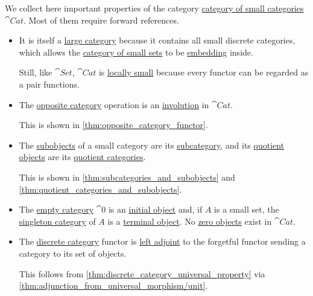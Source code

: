 \begin{remark}\label{rem:category_of_small_categories}
  We collect here important properties of the category \hyperref[def:category_of_small_categories]{category of small categories} \( \cat{Cat} \). Most of them require forward references.

  \begin{itemize}
    \item It is itself a \hyperref[def:small_category]{large category} because it contains all small discrete categories, which allows the \hyperref[def:category_of_small_sets]{category of small sets} to be \hyperref[def:functor_invertibility/injective]{embedding} inside.

    Still, like \( \cat{Set} \), \( \cat{Cat} \) is \hyperref[def:small_category]{locally small} because every functor can be regarded as a pair functions.

    \item The \hyperref[def:opposite_category]{opposite category} operation is an \hyperref[def:categorical_involution]{involution} in \( \cat{Cat} \).

    This is shown in \cref{thm:opposite_category_functor}.

    \item The \hyperref[def:categorical_subobject]{subobjects} of a small category are its \hyperref[def:subcategory]{subcategory}, and its \hyperref[def:categorical_quotient_object]{quotient objects} are its \hyperref[def:quotient_category]{quotient categories}.

    This is shown in \cref{thm:subcategories_and_subobjects} and \cref{thm:quotient_categories_and_subobjects}.

    \item The \hyperref[def:empty_category]{empty category} \( \cat{0} \) is an \hyperref[def:universal_objects/initial]{initial object} and, if \( A \) is a small set, the \hyperref[def:singleton_category]{singleton category} of \( A \) is a \hyperref[def:universal_objects/terminal]{terminal object}. No \hyperref[def:universal_objects/zero]{zero objects} exist in \( \cat{Cat} \).

    \item The \hyperref[def:discrete_category]{discrete category} functor is \hyperref[def:adjoint_functor]{left adjoint} to the forgetful functor sending a category to its set of objects.

    This follows from \cref{thm:discrete_category_universal_property} via \cref{thm:adjunction_from_universal_morphism/unit}.


\end{itemize}
\end{remark}
